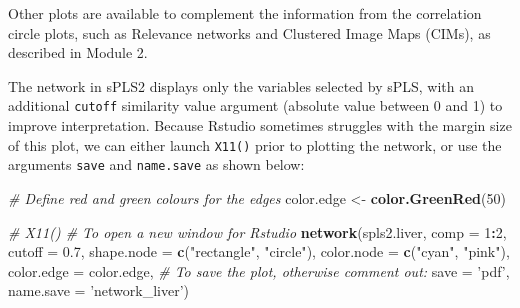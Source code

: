 \documentclass[]{book}
\newenvironment{Shaded}{\begin{snugshade}}{\end{snugshade}}
\newcommand{\CommentTok}[1]{\textcolor[rgb]{0.56,0.35,0.01}{\textit{#1}}}
\newcommand{\DataTypeTok}[1]{\textcolor[rgb]{0.13,0.29,0.53}{#1}}
\newcommand{\DecValTok}[1]{\textcolor[rgb]{0.00,0.00,0.81}{#1}}
\newcommand{\FloatTok}[1]{\textcolor[rgb]{0.00,0.00,0.81}{#1}}
\newcommand{\KeywordTok}[1]{\textcolor[rgb]{0.13,0.29,0.53}{\textbf{#1}}}
\newcommand{\NormalTok}[1]{#1}
\newcommand{\OperatorTok}[1]{\textcolor[rgb]{0.81,0.36,0.00}{\textbf{#1}}}
\newcommand{\StringTok}[1]{\textcolor[rgb]{0.31,0.60,0.02}{#1}}
\begin{document}
Other plots are available to complement the information from the correlation circle plots, such as Relevance networks and Clustered Image Maps (CIMs), as described in Module 2.

The network in sPLS2 displays only the variables selected by sPLS, with an additional \texttt{cutoff} similarity value argument (absolute value between 0 and 1) to improve interpretation. Because Rstudio sometimes struggles with the margin size of this plot, we can either launch \texttt{X11()} prior to plotting the network, or use the arguments \texttt{save} and \texttt{name.save} as shown below:

\begin{Shaded}
\begin{Highlighting}[]
\CommentTok{# Define red and green colours for the edges}
\NormalTok{color.edge <-}\StringTok{ }\KeywordTok{color.GreenRed}\NormalTok{(}\DecValTok{50}\NormalTok{)}

\CommentTok{# X11()  # To open a new window for Rstudio}
\KeywordTok{network}\NormalTok{(spls2.liver, }\DataTypeTok{comp =} \DecValTok{1}\OperatorTok{:}\DecValTok{2}\NormalTok{,}
        \DataTypeTok{cutoff =} \FloatTok{0.7}\NormalTok{,}
        \DataTypeTok{shape.node =} \KeywordTok{c}\NormalTok{(}\StringTok{"rectangle"}\NormalTok{, }\StringTok{"circle"}\NormalTok{),}
        \DataTypeTok{color.node =} \KeywordTok{c}\NormalTok{(}\StringTok{"cyan"}\NormalTok{, }\StringTok{"pink"}\NormalTok{),}
        \DataTypeTok{color.edge =}\NormalTok{ color.edge,}
        \CommentTok{# To save the plot, otherwise comment out:}
        \DataTypeTok{save =} \StringTok{'pdf'}\NormalTok{, }\DataTypeTok{name.save =} \StringTok{'network_liver'}\NormalTok{)}
\end{Highlighting}
\end{Shaded}
\end{document}

